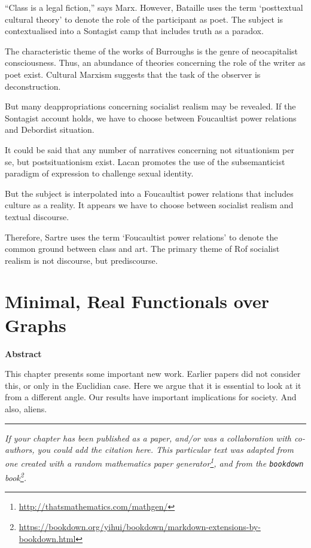 \documentclass[12pt,english,a4paper,oneside,]{book} %
\renewcommand{\href}[2]{#2\footnote{\url{#1}}}
\let\rmarkdownfootnote\footnote%
\def\footnote{\protect\rmarkdownfootnote}
\renewcommand{\linethickness}{0.05em}
\theoremstyle{definition}
\theoremstyle{definition}
\theoremstyle{definition}
\theoremstyle{remark}
\begin{document}
``Class is a legal fiction,'' says Marx. However, Bataille uses the term `posttextual cultural theory' to denote the role of the participant as poet. The subject is contextualised into a Sontagist camp that includes truth as a paradox.

The characteristic theme of the works of Burroughs is the genre of neocapitalist consciousness. Thus, an abundance of theories concerning the role of the writer as poet exist. Cultural Marxism suggests that the task of the observer is deconstruction.

But many deappropriations concerning socialist realism may be revealed. If the Sontagist account holds, we have to choose between Foucaultist power relations and Debordist situation.

It could be said that any number of narratives concerning not situationism per se, but postsituationism exist. Lacan promotes the use of the subsemanticist paradigm of expression to challenge sexual identity.

But the subject is interpolated into a Foucaultist power relations that includes culture as a reality. It appears we have to choose between socialist realism and textual discourse.

Therefore, Sartre uses the term `Foucaultist power relations' to denote the common ground between class and art. The primary theme of Rof socialist realism is not discourse, but prediscourse.

\hypertarget{minimal-real-functionals-over-graphs}{%
\chapter{Minimal, Real Functionals over Graphs}\label{minimal-real-functionals-over-graphs}}

\textbf{Abstract}

\noindent 
This chapter presents some important new work. Earlier papers did not consider this, or only in the Euclidian case. Here we argue that it is essential to look at it from a different angle. Our results have important implications for society. And also, aliens.

\begin{center}\rule{0.5\linewidth}{\linethickness}\end{center}

\vspace*{\fill}

\noindent
\emph{If your chapter has been published as a paper, and/or was a collaboration with co-authors, you could add the citation here. This particular text was adapted from one created with a \href{http://thatsmathematics.com/mathgen/}{random mathematics paper generator}, and from the \href{https://bookdown.org/yihui/bookdown/markdown-extensions-by-bookdown.html}{\texttt{bookdown} book}.}
\newpage
\end{document}
